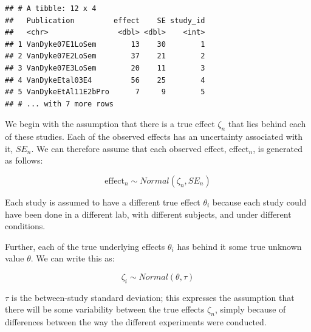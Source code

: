 \documentclass[12pt,]{krantz}
\newenvironment{Shaded}{\begin{snugshade}}{\end{snugshade}}
\newcommand{\DataTypeTok}[1]{\textcolor[rgb]{0.13,0.29,0.53}{#1}}
\newcommand{\DecValTok}[1]{\textcolor[rgb]{0.00,0.00,0.81}{#1}}
\newcommand{\KeywordTok}[1]{\textcolor[rgb]{0.13,0.29,0.53}{\textbf{#1}}}
\newcommand{\NormalTok}[1]{#1}
\newcommand{\OperatorTok}[1]{\textcolor[rgb]{0.81,0.36,0.00}{\textbf{#1}}}
\newcommand{\StringTok}[1]{\textcolor[rgb]{0.31,0.60,0.02}{#1}}
\theoremstyle{definition}
\theoremstyle{definition}
\theoremstyle{definition}
\theoremstyle{remark}
\begin{document}
\begin{Shaded}
\end{Shaded}

\begin{verbatim}
## # A tibble: 12 x 4
##   Publication         effect    SE study_id
##   <chr>                <dbl> <dbl>    <int>
## 1 VanDyke07E1LoSem        13    30        1
## 2 VanDyke07E2LoSem        37    21        2
## 3 VanDyke07E3LoSem        20    11        3
## 4 VanDykeEtal03E4         56    25        4
## 5 VanDykeEtAl11E2bPro      7     9        5
## # ... with 7 more rows
\end{verbatim}

We begin with the assumption that there is a true effect \(\zeta_n\) that lies behind each of these studies. Each of the observed effects has an uncertainty associated with it, \(SE_n\). We can therefore assume that each observed effect, effect\(_n\), is generated as follows:

\begin{equation}
\text{effect}_n \sim Normal(\zeta_n,SE_n)
\end{equation}

Each study is assumed to have a different true effect \(\theta_i\) because each study could have been done in a different lab, with different subjects, and under different conditions.

Further, each of the true underlying effects \(\theta_i\) has behind it some true unknown value \(\theta\). We can write this as:

\begin{equation}
\zeta_i \sim Normal(\theta,\tau)
\end{equation}

\(\tau\) is the between-study standard deviation; this expresses the assumption that there will be some variability between the true effects \(\zeta_n\), simply because of differences between the way the different experiments were conducted.
\end{document}
